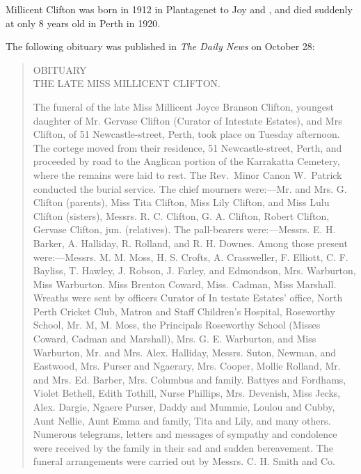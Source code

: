 
Millicent Clifton was born in 1912 in Plantagenet\cite{MJBCbirth} to Joy and , and died suddenly at only 8 years old in Perth in 1920.\cite{MJBCdeath}

The following obituary was published in \emph{The Daily News} on October 28:\cite{MJBCobit}

\begin{quotation}
\begin{center}
OBITUARY \\
THE LATE MISS MILLICENT CLIFTON.
\end{center}

The funeral of the late Miss Millicent Joyce Branson Clifton, youngest daughter of Mr. Gervase Clifton (Curator of Intestate Estates),
and Mrs Clifton, of 51 Newcastle-street, Perth, took place on Tuesday afternoon. The cortege moved from their residence, 51 Newcastle-street,
Perth, and proceeded by road to the Anglican portion of the Karrakatta Cemetery, where the remains were laid to rest.
The Rev.\ Minor Canon W.\ Patrick conducted the burial service. The chief mourners were:---Mr. and Mrs. G. Clifton (parents),
Miss Tita Clifton, Miss Lily Clifton, and Miss Lulu Clifton (sisters), Messrs. R. C. Clifton, G. A. Clifton, Robert Clifton, Gervase Clifton, jun. (relatives). The pall-bearers were:---Messrs. E. H. Barker, A. Halliday, R. Rolland, and R. H. Downes. Among those present were:---Messrs. M. M. Moss, H. S. Crofts, A. Crassweller, F. Elliott, C. F. Bayliss, T. Hawley, J. Robson, J. Farley, and Edmondson, Mrs. Warburton, Miss Warburton. Miss Brenton Coward, Miss. Cadman, Miss Marshall. Wreaths were sent by officers Curator of In testate Estates' office, North Perth Cricket Club, Matron and Staff Children's Hospital, Roseworthy School, Mr. M, M. Moss, the Principals Roseworthy School (Misses Coward, Cadman and Marshall), Mrs. G. E. Warburton, and Miss Warburton, Mr. and Mrs. Alex. Halliday, Messrs. Suton, Newman, and Eastwood, Mrs. Purser and Ngaerary, Mrs. Cooper, Mollie Rolland, Mr. and Mrs. Ed. Barber, Mrs. Columbus and family. Battyes and Fordhams, Violet Bethell, Edith Tothill, Nurse Phillips, Mrs. Devenish, Miss Jecks, Alex. Dargie, Ngaere Purser, Daddy and Mummie, Loulou and Cubby, Aunt Nellie, Aunt Emma and family, Tita and Lily, and many others. Numerous telegrams, letters and messages of sympathy and condolence were received by the family in their sad and sudden bereavement. The funeral arrangements were carried out by Messrs. C. H. Smith and Co.
\end{quotation}
